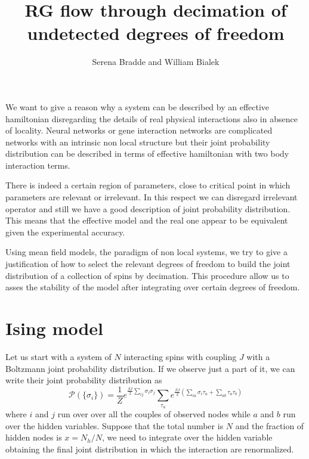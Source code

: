 \documentclass[aps,pre,noshowpacs]{revtex4}
\begin{document}
\title{RG flow through decimation of undetected degrees of freedom}

\author{Serena Bradde and William Bialek}
\maketitle
We want to give a reason why a system can be described by an effective hamiltonian
disregarding the details of real physical interactions also in absence of locality.
Neural networks or gene interaction networks are complicated networks
with an intrinsic non local structure but their joint probability distribution
can be described in terms of effective hamiltonian with two body interaction terms.

There is indeed a certain region of parameters, close to critical point in which parameters
are relevant or irrelevant. In this respect we can disregard irrelevant operator and still
we have a good description of joint probability distribution. This means that 
the effective model and the real one appear to be equivalent given the experimental accuracy.

Using mean field models, the paradigm of non local systems, we try to give a justification of 
how to select the relevant degrees of freedom to build the joint distribution of a collection of spins
by decimation. This procedure allow us to asses the stability of the model after integrating over
certain degrees of freedom.


\section{Ising model}

Let us start with a system of $N$ interacting spins with coupling $J$ with a Boltzmann joint probability distribution. 
If we observe just a part of it, we can write their joint probability distribution as
\begin{equation}\label{fullprob}
\mathcal{P}(\{\sigma_i\}) = \frac{1}{Z} e^{ \frac{\beta J}{2} \sum_{i j}  \sigma_i \sigma_j}  \sum_{\tau_a} e^{ \frac{\beta J}{2}\left( \sum_{ia} \sigma_i \tau_a + \sum_{ab} \tau_a \tau_b\right) }
\end{equation}
where $i$ and $j$ run over over all the couples of observed nodes while $a$ and $b$ run over the hidden variables. 
Suppose that the total number is $N$ and the fraction of hidden nodes is $x=N_h/N$, we need to
integrate over the hidden variable obtaining the final joint distribution in which the interaction
are renormalized.
\end{document}
